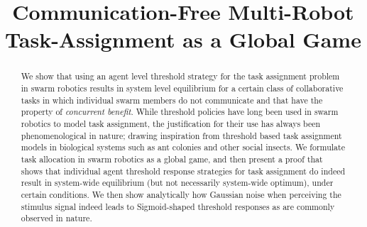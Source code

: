 \documentclass[conference]{ieeeconf}
\begin{document}
\title{Communication-Free Multi-Robot Task-Assignment as a Global Game}

\author{
\and
{}
}

\maketitle

\begin{abstract}
We show that using an agent level threshold strategy for the task assignment problem in swarm robotics results in system level equilibrium for a certain class of collaborative tasks in which individual swarm members do not communicate and that have the property of \emph{concurrent benefit}. While threshold policies have long been used in swarm robotics to model task assignment, the justification for their use has always been phenomenological in nature; drawing inspiration from threshold based task assignment models in biological systems such as ant colonies and other social insects. We formulate task allocation in swarm robotics as a global game, and then present a proof that shows that individual agent threshold response strategies for task assignment do indeed result in system-wide equilibrium (but not necessarily system-wide optimum), under certain conditions. We then show analytically how Gaussian noise when perceiving the stimulus signal indeed leads to Sigmoid-shaped threshold responses as are commonly observed in nature. 
\end{abstract}

\IEEEpeerreviewmaketitle

\end{document}
